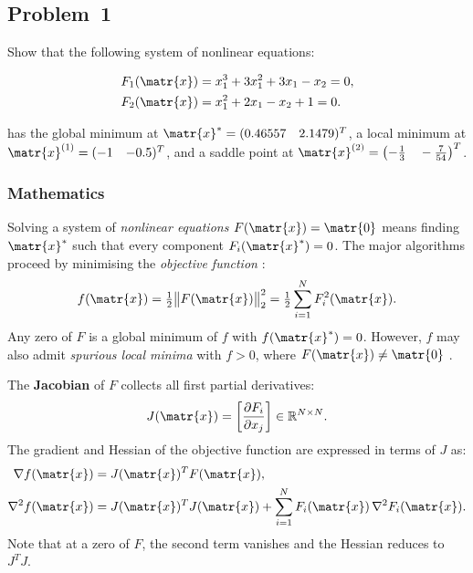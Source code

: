 \subsection{Problem~1}%
\label{problem:1}

Show that the following system of nonlinear equations:

\begin{align*}
  F_1(\matr{x}) &= x_1^3 + 3x_1^2 + 3x_1 - x_2 = 0, \\
  F_2(\matr{x}) &= x_1^2 + 2x_1 - x_2 + 1 = 0.
\end{align*}

has the global minimum at $\matr{x}^* = (0.46557 \quad 2.1479)^T$, a local minimum at
$\matr{x}^{(1)} = (-1 \quad {-0.5})^T$, and a saddle point at
$\matr{x}^{(2)} = \bigl(-\tfrac{1}{3} \quad -\tfrac{7}{54}\bigr)^T$.

\subsubsection*{Mathematics}

Solving a system of \emph{nonlinear equations} $F(\matr{x}) = \matr{0}$
means finding $\matr{x}^*$ such that every component $F_i(\matr{x}^*) = 0$.
The major algorithms proceed by minimising the \emph{objective function} \citep{Zdunek}:
\begin{equation*}
  f(\matr{x}) = \tfrac{1}{2}\bigl\|F(\matr{x})\bigr\|_2^2
              = \tfrac{1}{2}\sum_{i=1}^{N} F_i^2(\matr{x}).
\end{equation*}
Any zero of $F$ is a global minimum of $f$ with $f(\matr{x}^*) = 0$.
However, $f$ may also admit \emph{spurious local minima} with $f > 0$,
where $F(\matr{x}) \neq \matr{0}$ \citep{NoceWrig99}.

The \textbf{Jacobian} of $F$ collects all first partial derivatives:
\begin{equation*}
  J(\matr{x}) = \left[\frac{\partial F_i}{\partial x_j}\right] \in \mathbb{R}^{N \times N}.
\end{equation*}
The gradient and Hessian of the objective function are expressed in terms of $J$ as:
\begin{align*}
  \nabla f(\matr{x})   &= J(\matr{x})^T F(\matr{x}), \\
  \nabla^2 f(\matr{x}) &= J(\matr{x})^T J(\matr{x})
                          + \sum_{i=1}^{N} F_i(\matr{x})\,\nabla^2 F_i(\matr{x}).
\end{align*}
Note that at a zero of $F$, the second term vanishes and the Hessian
reduces to $J^T J$.

